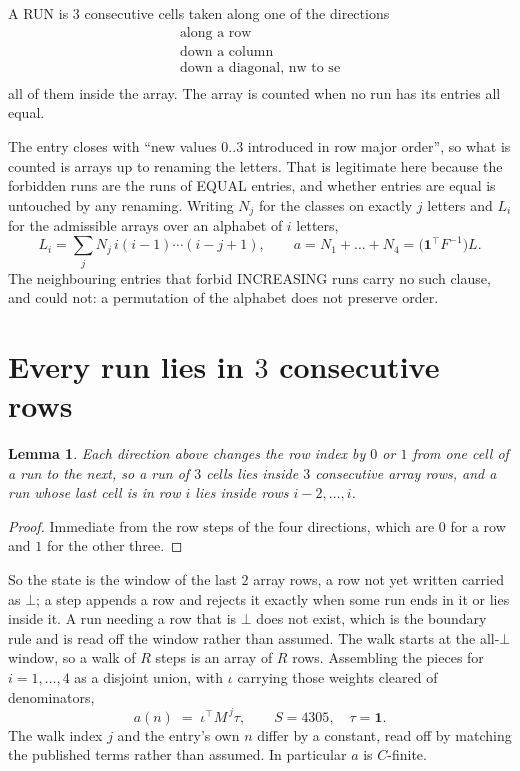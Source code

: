 \documentclass[11pt,a4paper]{article}
\theoremstyle{plain}
\newtheorem{lemma}[theorem]{Lemma}
\theoremstyle{definition}
\begin{document}
A RUN is $3$ consecutive cells taken along one of the directions
\[
\begin{array}{l}
\text{along a row} \\
\text{down a column} \\
\text{down a diagonal, nw to se} \\
\end{array}
\]
all of them inside the array. The array is counted when no run has its entries all equal.


The entry closes with ``new values $0..3$ introduced in row major order'', so what is counted
is arrays up to renaming the letters. That is legitimate here because the forbidden runs are
the runs of EQUAL entries, and whether entries are equal is untouched by any renaming. Writing
$N_j$ for the classes on exactly $j$ letters and $L_i$ for the admissible arrays over an
alphabet of $i$ letters,
\[
L_i=\sum_j N_j\,i(i-1)\cdots(i-j+1),\qquad
a=N_1+\dots+N_{4}=\bigl(\mathbf{1}^{\!\top}F^{-1}\bigr)L .
\]
The neighbouring entries that forbid INCREASING runs carry no such clause, and could not: a
permutation of the alphabet does not preserve order.

\section{Every run lies in $3$ consecutive rows}

\begin{lemma}\label{lem:win}
Each direction above changes the row index by $0$ or $1$ from one cell of a run to the next, so
a run of $3$ cells lies inside $3$ consecutive array rows, and a run whose last cell is in
row $i$ lies inside rows $i-2,\dots,i$.
\end{lemma}

\begin{proof}
Immediate from the row steps of the four directions, which are $0$ for a row and $1$ for the
other three.
\end{proof}

So the state is the window of the last $2$ array rows, a row not yet written carried as
$\bot$; a step appends a row and rejects it exactly when some run ends in it or lies inside it.
A run needing a row that is $\bot$ does not exist, which is the boundary rule and is read off
the window rather than assumed. The walk starts at the all-$\bot$ window, so a walk of $R$ steps
is an array of $R$ rows. Assembling the pieces for $i=1,\dots,4$ as a disjoint union, with $\iota$ carrying those weights cleared of denominators,
\[
a(n)\;=\;\iota^{\!\top}M^{\,j}\tau ,\qquad S=4305,\quad\tau=\mathbf{1} .
\]
The walk index $j$ and the entry's own $n$ differ by a constant, read off by matching the
published terms rather than assumed. In particular $a$ is $C$-finite.
\end{document}

